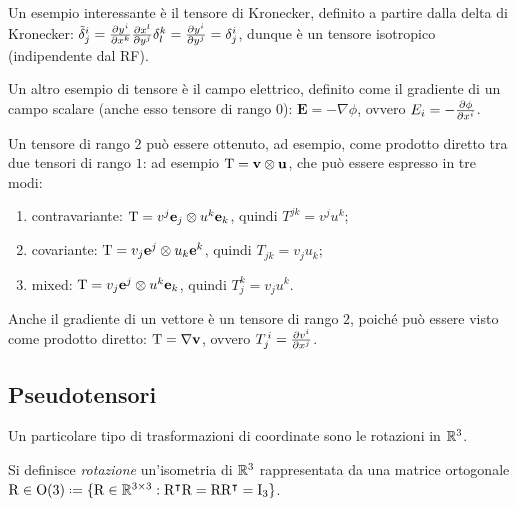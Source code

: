 \begin{example}
	Un esempio interessante è il tensore di Kronecker, definito a partire dalla delta di Kronecker: $ \tilde{\delta}^i_j = \frac{\partial y^i}{\partial x^k} \frac{\partial x^l}{\partial y^j} \delta^k_l = \frac{\partial y^i}{\partial y^j} = \delta^i_j $, dunque è un tensore isotropico (indipendente dal RF).
\end{example}

\begin{example}
	Un altro esempio di tensore è il campo elettrico, definito come il gradiente di un campo scalare (anche esso tensore di rango $ 0 $): $ \mathbf{E} = -\nabla\phi $, ovvero $ E_i = - \frac{\partial \phi}{\partial x^i} $.
\end{example}

\begin{example}
	Un tensore di rango $ 2 $ può essere ottenuto, ad esempio, come prodotto diretto tra due tensori di rango $ 1 $: ad esempio $ \mathrm{T} = \mathbf{v} \otimes \mathbf{u} $, che può essere espresso in tre modi:
	\begin{enumerate}
		\item contravariante: $ \mathrm{T} = v^j \mathbf{e}_j \otimes u^k \mathbf{e}_k $, quindi $ T^{jk} = v^j u^k $;
		\item covariante: $ \mathrm{T} = v_j \mathbf{e}^j \otimes u_k \mathbf{e}^k $, quindi $ T_{jk} = v_j u_k $;
		\item mixed: $ \mathrm{T} = v_j \mathbf{e}^j \otimes u^k \mathbf{e}_k $, quindi $ T_j^k = v_j u^k $.
	\end{enumerate}
\end{example}

\begin{example}
	Anche il gradiente di un vettore è un tensore di rango $ 2 $, poiché può essere visto come prodotto diretto: $ \mathrm{T} = \nabla\mathbf{v} $, ovvero $ T^{\,i}_j = \frac{\partial v^i}{\partial x^j} $.
\end{example}


\subsection{Pseudotensori}


Un particolare tipo di trasformazioni di coordinate sono le rotazioni in $ \mathbb{R}^3 $.

\begin{definition}
	Si definisce \textit{rotazione} un'isometria di $ \mathbb{R}^3 $ rappresentata da una matrice ortogonale $ \tens{R} \in \Ot \defeq \{\tens{R} \in \R^{3\times3} : \tens{R}^{\intercal}\tens{R} = \tens{R}\tens{R}^{\intercal} = \tens{I}_3 \} $.
\end{definition}

